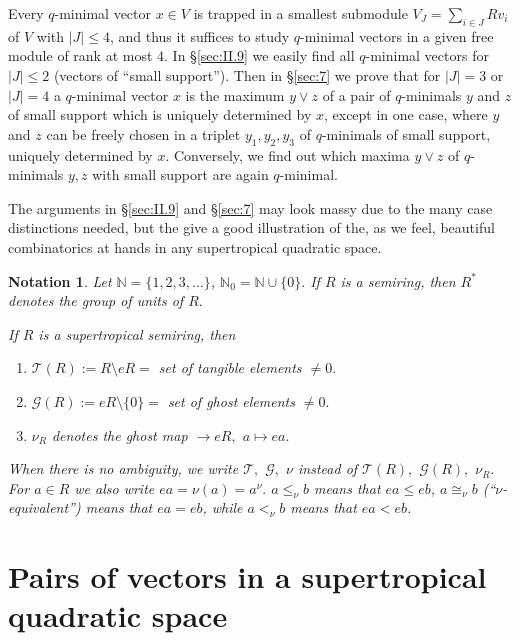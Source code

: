\documentclass [12pt,a4paper,reqno]{amsart}
\newtheorem{notation}[thm]{Notation}
\begin{document}
Every $q$-minimal vector $x \in V$ is trapped in a smallest submodule $V_J = \sum_{i \in J} R v_i$ of $V$ with $|J| \leq 4$, and thus it suffices to study $q$-minimal vectors in a given free module of rank at most $4$. In \S\ref{sec:II.9} we easily find all $q$-minimal vectors for $|J| \leq 2$ (vectors of ``small support''). Then in
\S\ref{sec:7}  we prove that for $|J| = 3$ or $|J| = 4$ a  $q$-minimal vector $x$ is the maximum $y \vee z$ of a pair of  $q$-minimals $y$ and $z$ of small support which is  uniquely determined by $x$, except in one case, where $y$ and $z$ can be freely chosen in a triplet $y_1, y_2, y_3$ of  $q$-minimals of small support,  uniquely determined by $x$. Conversely, we find out which maxima $y \vee z$ of $q$-minimals $y,z$ with small support are again $q$-minimal.

The arguments in \S\ref{sec:II.9} and \S\ref{sec:7} may look massy due to the many case distinctions needed, but the give a good illustration of the, as we feel, beautiful combinatorics at hands in any supertropical quadratic space.

\begin{notation}\label{notation:0.1}
Let $\mathbb N=\{1,2,3,\dots\}$, $\mathbb N_0=\mathbb N\cup\{0\}.$
If $R$ is a semiring, then $R^*$ denotes the group of units of
$R.$

If $R$ is a supertropical semiring, then
\begin{enumerate} {\setlength{\itemsep}{2pt}}
\item[$\bullet$] ${\mathcal T}(R):=R{\setminus} eR=$ set of tangible
elements $\ne 0.$

 \item[$\bullet$] ${\mathcal G}(R):=eR{\setminus} \{0\}=$
set of ghost elements $\ne 0.$

\item[$\bullet$] $\nu_R$ denotes the ghost map $\to eR,$ $a\mapsto
ea.$
\end{enumerate}
When there is no ambiguity, we write ${\mathcal T},$ ${\mathcal G},$
$\nu$ instead of ${\mathcal T}(R),$ ${\mathcal G}(R),$
$\nu_R.$\newline For $a\in R$ we also write $ea=\nu(a)=a^\nu.$ $a \leq_\nu b$  means that $ea  \leq eb$, $a {\cong_\nu} b$ (``$\nu$-equivalent'') means that $ea  = eb$, while  $a <_\nu b$  means that $ea  < eb$.
\end{notation}

\section{Pairs of vectors in a supertropical quadratic space}\label{sec:II.5}
\end{document}
